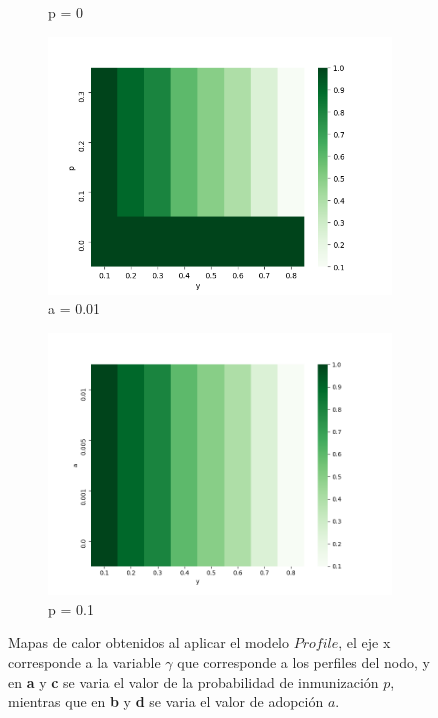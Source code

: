 \documentclass{article}
\begin{document}
\begin{figure}[h]
\begin{subfigure}[b]{0.5\textwidth}
		\caption{p = 0}
		\label{fig:hm06}
	\end{subfigure}
	\hfill
	\begin{subfigure}[b]{0.5\textwidth}
		\includegraphics[width=\textwidth]{../Images/hm07.png}
		\caption{a = 0.01}
		\label{fig:hm07}
	\end{subfigure}
	\begin{subfigure}[b]{0.5\textwidth}
		\includegraphics[width=\textwidth]{../Images/hm08.png}
		\caption{p = 0.1}
		\label{fig:hm08}
	\end{subfigure}
	\label{fig:hm2}
	\caption{Mapas de calor obtenidos al aplicar el modelo $Profile$, el eje x corresponde a la variable $\gamma$ que corresponde a los perfiles del nodo, y en \textbf{a} y \textbf{c} se varia el valor de la probabilidad de inmunización $p$, mientras que en \textbf{b} y \textbf{d} se varia el valor de adopción $a$.}
\end{figure}
\end{document}
